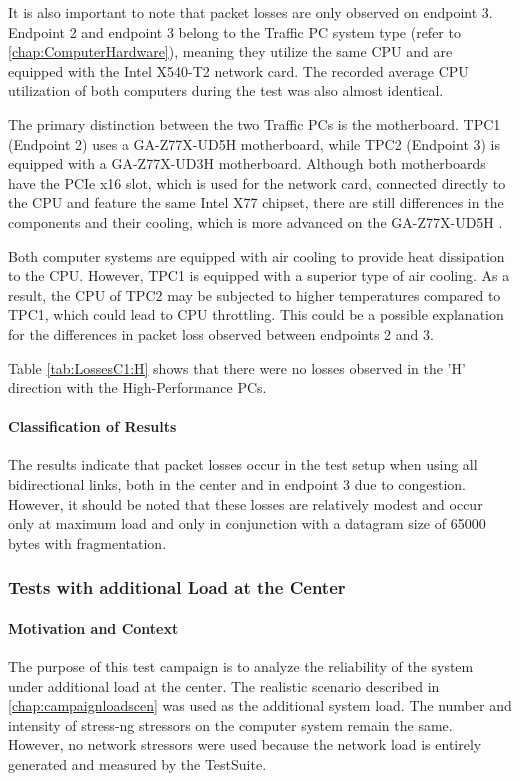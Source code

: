 It is also important to note that packet losses are only observed on endpoint 3. Endpoint 2 and endpoint 3 belong to the Traffic PC system type (refer to \ref{chap:ComputerHardware}), meaning they utilize the same CPU and are equipped with the Intel X540-T2 network card. The recorded average CPU utilization of both computers during the test  was also almost identical.

The primary distinction between the two Traffic PCs is the motherboard. TPC1 (Endpoint 2) uses a GA-Z77X-UD5H motherboard, while TPC2 (Endpoint 3) is equipped with a GA-Z77X-UD3H motherboard. Although both motherboards have the PCIe x16 slot, which is used for the network card, connected directly to the CPU and feature the same Intel X77 chipset, there are still differences in the components and their cooling, which is more advanced on the GA-Z77X-UD5H \cite{reli04, reli05}.

Both computer systems are equipped with air cooling to provide heat dissipation to the CPU. However, TPC1 is equipped with a superior type of air cooling. As a result, the CPU of TPC2 may be subjected to higher temperatures compared to TPC1, which could lead to CPU throttling. This could be a possible explanation for the differences in packet loss observed between endpoints 2 and 3.

Table \ref{tab:LossesC1:H} shows that there were no losses observed in the 'H' direction with the High-Performance PCs.

\paragraph{Classification of Results}

The results indicate that packet losses occur in the test setup when using all bidirectional links, both in the center and in endpoint 3 due to congestion. However, it should be noted that these losses are relatively modest and occur only at maximum load and only in conjunction with a datagram size of 65000 bytes with fragmentation.

\subsubsection{Tests with additional Load at the Center}

\paragraph{Motivation and Context}
The purpose of this test campaign is to analyze the reliability of the system under additional load at the center. The realistic scenario described in \ref{chap:campaignloadscen} was used as the additional system load. The number and intensity of stress-ng stressors on the computer system remain the same. However, no network stressors were used because the network load is entirely generated and measured by the TestSuite.

